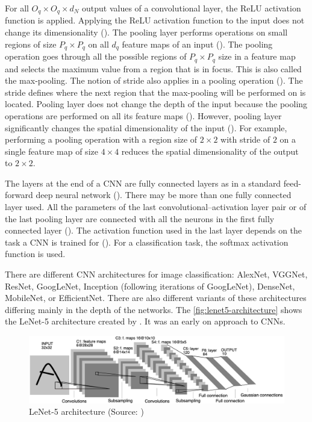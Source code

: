 \documentclass{BachelorBUI}
\begin{document}
                For all $O_{q} \times O_{q} \times d_N$ output values of a convolutional layer, the ReLU activation function is applied. Applying the ReLU activation function to the input does not change its dimensionality (\cite{Aggarwal:2018}). The pooling layer performs operations on small regions of size $P_{q} \times P_{q}$ on all $d_{q}$ feature maps of an input (\cite{Aggarwal:2018}). The pooling operation goes through all the possible regions of $P_{q} \times P_{q}$ size in a feature map and selects the maximum value from a region that is in focus. This is also called the max-pooling. The notion of stride also applies in a pooling operation (\cite{Aggarwal:2018}). The stride defines where the next region that the max-pooling will be performed on is located. Pooling layer does not change the depth of the input because the pooling operations are performed on all its feature maps (\cite{Aggarwal:2018}). However, pooling layer significantly changes the spatial dimensionality of the input (\cite{Aggarwal:2018}). For example, performing a pooling operation with a region size of $2 \times 2$ with stride of $2$ on a single feature map of size $4 \times 4$ reduces the spatial dimensionality of the output to $2 \times 2$.

                The layers at the end of a CNN are fully connected layers as in a standard feed-forward deep neural network (\cite{Aggarwal:2018}). There may be more than one fully connected layer used. All the parameters of the last convolutional--activation layer pair or of the last pooling layer are connected with all the neurons in the first fully connected layer (\cite{Aggarwal:2018}). The activation function used in the last layer depends on the task a CNN is trained for (\cite{Aggarwal:2018}). For a classification task, the softmax activation function is used. 

                There are different CNN architectures for image classification: AlexNet, VGGNet, ResNet, GoogLeNet, Inception (following iterations of GoogLeNet), DenseNet, MobileNet, or EfficientNet. There are also different variants of these architectures differing mainly in the depth of the networks. The \autoref{fig:lenet5-architecture} shows the LeNet-5 architecture created by \textcite{LeCun:1998}. It was an early on approach to CNNs.
                \begin{figure}[h]
                    \centering
                    \includegraphics[width=\textwidth]{lenet5_architecture.png}
                    \caption{LeNet-5 architecture (Source: \cite{LeCun:1998})}
                    \label{fig:lenet5-architecture}
                \end{figure}
\end{document}
